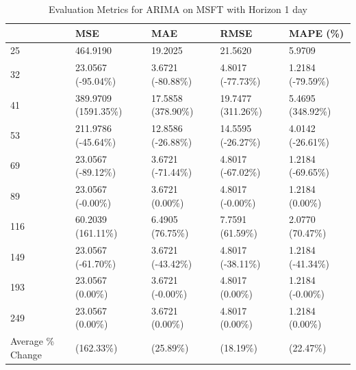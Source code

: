 \begin{table}
\caption{Evaluation Metrics for ARIMA on MSFT with Horizon 1 day}
\label{tab:arima_MSFT_h1_metrics}
\begin{tabular}{lllll}
\toprule
 & MSE & MAE & RMSE & MAPE (\%) \\
\midrule
25 & 464.9190 & 19.2025 & 21.5620 & 5.9709 \\
32 & 23.0567 (-95.04\%) & 3.6721 (-80.88\%) & 4.8017 (-77.73\%) & 1.2184 (-79.59\%) \\
41 & 389.9709 (1591.35\%) & 17.5858 (378.90\%) & 19.7477 (311.26\%) & 5.4695 (348.92\%) \\
53 & 211.9786 (-45.64\%) & 12.8586 (-26.88\%) & 14.5595 (-26.27\%) & 4.0142 (-26.61\%) \\
69 & 23.0567 (-89.12\%) & 3.6721 (-71.44\%) & 4.8017 (-67.02\%) & 1.2184 (-69.65\%) \\
89 & 23.0567 (-0.00\%) & 3.6721 (0.00\%) & 4.8017 (-0.00\%) & 1.2184 (0.00\%) \\
116 & 60.2039 (161.11\%) & 6.4905 (76.75\%) & 7.7591 (61.59\%) & 2.0770 (70.47\%) \\
149 & 23.0567 (-61.70\%) & 3.6721 (-43.42\%) & 4.8017 (-38.11\%) & 1.2184 (-41.34\%) \\
193 & 23.0567 (0.00\%) & 3.6721 (-0.00\%) & 4.8017 (0.00\%) & 1.2184 (-0.00\%) \\
249 & 23.0567 (0.00\%) & 3.6721 (0.00\%) & 4.8017 (0.00\%) & 1.2184 (0.00\%) \\
Average \% Change & (162.33\%) & (25.89\%) & (18.19\%) & (22.47\%) \\
\bottomrule
\end{tabular}
\end{table}
